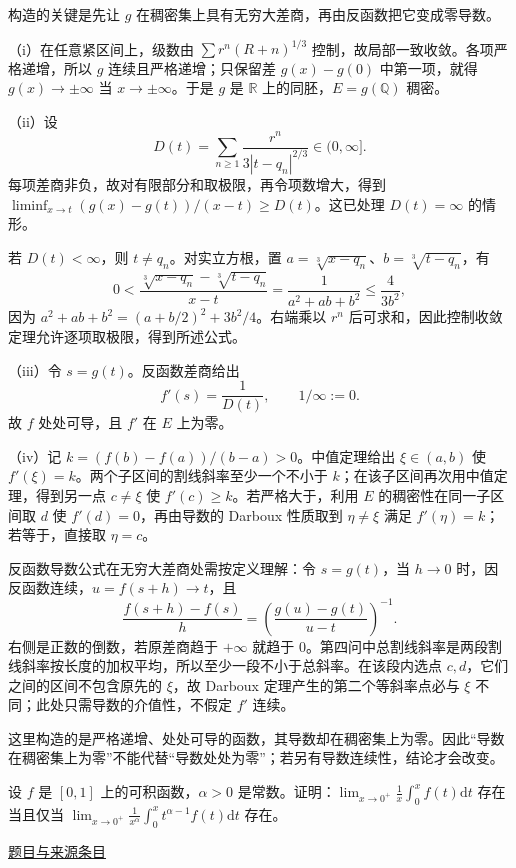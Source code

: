 \documentclass[12pt,fontset=fandol]{ctexart}
\begin{document}
\begin{solve}\label{ans:fin14-high:7}

构造的关键是先让 $g$ 在稠密集上具有无穷大差商，再由反函数把它变成零导数。

（i）在任意紧区间上，级数由 $\sum r^n(R+n)^{1/3}$ 控制，故局部一致收敛。各项严格递增，所以 $g$ 连续且严格递增；只保留差 $g(x)-g(0)$ 中第一项，就得 $g(x)\to\pm\infty$ 当 $x\to\pm\infty$。于是 $g$ 是 $\mathbb R$ 上的同胚，$E=g(\mathbb Q)$ 稠密。

（ii）设
\[
D(t)=\sum_{n\ge1}\frac{r^n}{3|t-q_n|^{2/3}}\in(0,\infty].
\]
每项差商非负，故对有限部分和取极限，再令项数增大，得到 $\liminf_{x\to t}(g(x)-g(t))/(x-t)\ge D(t)$。这已处理 $D(t)=\infty$ 的情形。

若 $D(t)<\infty$，则 $t\ne q_n$。对实立方根，置 $a=\sqrt[3]{x-q_n}$、$b=\sqrt[3]{t-q_n}$，有
\[
0<\frac{\sqrt[3]{x-q_n}-\sqrt[3]{t-q_n}}{x-t}
=\frac1{a^2+ab+b^2}\le\frac4{3b^2},
\]
因为 $a^2+ab+b^2=(a+b/2)^2+3b^2/4$。右端乘以 $r^n$ 后可求和，因此控制收敛定理允许逐项取极限，得到所述公式。

（iii）令 $s=g(t)$。反函数差商给出
\[
f'(s)=\frac1{D(t)},\qquad 1/\infty:=0.
\]
故 $f$ 处处可导，且 $f'$ 在 $E$ 上为零。

（iv）记 $k=(f(b)-f(a))/(b-a)>0$。中值定理给出 $\xi\in(a,b)$ 使 $f'(\xi)=k$。两个子区间的割线斜率至少一个不小于 $k$；在该子区间再次用中值定理，得到另一点 $c\ne\xi$ 使 $f'(c)\ge k$。若严格大于，利用 $E$ 的稠密性在同一子区间取 $d$ 使 $f'(d)=0$，再由导数的 Darboux 性质取到 $\eta\ne\xi$ 满足 $f'(\eta)=k$；若等于，直接取 $\eta=c$。

反函数导数公式在无穷大差商处需按定义理解：令 $s=g(t)$，当 $h\to0$ 时，因反函数连续，$u=f(s+h)\to t$，且
\[
\frac{f(s+h)-f(s)}h=\left(\frac{g(u)-g(t)}{u-t}\right)^{-1}.
\]
右侧是正数的倒数，若原差商趋于 $+\infty$ 就趋于 $0$。第四问中总割线斜率是两段割线斜率按长度的加权平均，所以至少一段不小于总斜率。在该段内选点 $c,d$，它们之间的区间不包含原先的 $\xi$，故 Darboux 定理产生的第二个等斜率点必与 $\xi$ 不同；此处只需导数的介值性，不假定 $f'$ 连续。

\end{solve}

\begin{remark}[方法与条件]这里构造的是严格递增、处处可导的函数，其导数却在稠密集上为零。因此“导数在稠密集上为零”不能代替“导数处处为零”；若另有导数连续性，结论才会改变。\end{remark}

\begin{example}\label{ex:fin14-low:9}\label{pr:fin14-low:9}

设 $f$ 是 $[0, 1]$ 上的可积函数，$\alpha > 0$ 是常数。证明：$\lim_{x \to 0^+} \frac{1}{x} \int_0^x f(t) \mathrm{d}t$ 存在当且仅当 $\lim_{x \to 0^+} \frac{1}{x^\alpha} \int_0^x t^{\alpha-1} f(t) \mathrm{d}t$ 存在。

\par\href{https://github.com/lzxcr/cmc-mathematics/blob/64916fa1fdbc3e444a652eca204d5669058ee321/src/problems/finals/14/10.md}{题目与来源条目}

\end{example}
\end{document}
